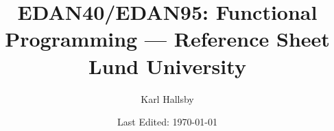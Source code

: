 





\begin{titlepage}
  \title{EDAN40/EDAN95: Functional Programming --- Reference Sheet \\ Lund University}
  \author{Karl Hallsby}
  \date{Last Edited: \today} %
\end{titlepage}


\maketitle
{} %
\tableofcontents
\clearpage
\listoftheorems[ignoreall, show={definition, Definition}]
\clearpage
{} %

\nocite{*}



\appendix
{}

\clearpage


\clearpage


\clearpage


\clearpage


\clearpage
\printbibliography{}
